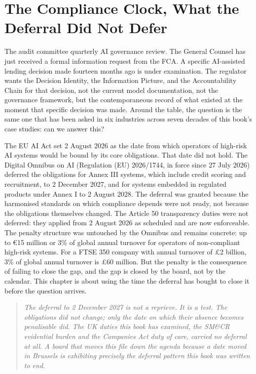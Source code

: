 
\chapter{The Compliance Clock, What the Deferral Did Not Defer}

The audit committee quarterly AI governance review. The General Counsel has just received a formal information request from the FCA. A specific AI-assisted lending decision made fourteen months ago is under examination. The regulator wants the Decision Identity, the Information Picture, and the Accountability Chain for that decision, not the current model documentation, not the governance framework, but the contemporaneous record of what existed at the moment that specific decision was made. Around the table, the question is the same one that has been asked in six industries across seven decades of this book's case studies: can we answer this?

The EU AI Act set 2 August 2026 as the date from which operators of high-risk AI systems would be bound by its core obligations. That date did not hold. The Digital Omnibus on AI (Regulation (EU) 2026/1744, in force since 27 July 2026) deferred the obligations for Annex III systems, which include credit scoring and recruitment, to 2 December 2027, and for systems embedded in regulated products under Annex I to 2 August 2028. The deferral was granted because the harmonised standards on which compliance depends were not ready, not because the obligations themselves changed. The Article 50 transparency duties were not deferred: they applied from 2 August 2026 as scheduled and are now enforceable. The penalty structure was untouched by the Omnibus and remains concrete: up to €15 million or 3\% of global annual turnover for operators of non-compliant high-risk systems. For a FTSE 350 company with annual turnover of £2 billion, 3\% of global annual turnover is £60 million. But the penalty is the consequence of failing to close the gap, and the gap is closed by the board, not by the calendar. This chapter is about using the time the deferral has bought to close it before the question arrives.

\begin{quote}
\emph{The deferral to 2 December 2027 is not a reprieve. It is a test. The obligations did not change; only the date on which their absence becomes penalisable did. The UK duties this book has examined, the SM\&CR evidential burden and the Companies Act duty of care, carried no deferral at all. A board that moves this file down the agenda because a date moved in Brussels is exhibiting precisely the deferral pattern this book was written to end.}
\end{quote}

